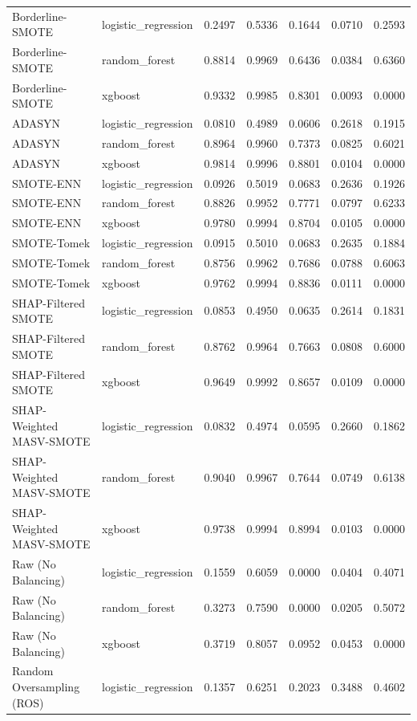 \begin{table}[htbp]
\begin{tabular}{lllllll}
Borderline-SMOTE & logistic_regression & 0.2497 & 0.5336 & 0.1644 & 0.0710 & 0.2593 \\
Borderline-SMOTE & random_forest & 0.8814 & 0.9969 & 0.6436 & 0.0384 & 0.6360 \\
Borderline-SMOTE & xgboost & 0.9332 & 0.9985 & 0.8301 & 0.0093 & 0.0000 \\
ADASYN & logistic_regression & 0.0810 & 0.4989 & 0.0606 & 0.2618 & 0.1915 \\
ADASYN & random_forest & 0.8964 & 0.9960 & 0.7373 & 0.0825 & 0.6021 \\
ADASYN & xgboost & 0.9814 & 0.9996 & 0.8801 & 0.0104 & 0.0000 \\
SMOTE-ENN & logistic_regression & 0.0926 & 0.5019 & 0.0683 & 0.2636 & 0.1926 \\
SMOTE-ENN & random_forest & 0.8826 & 0.9952 & 0.7771 & 0.0797 & 0.6233 \\
SMOTE-ENN & xgboost & 0.9780 & 0.9994 & 0.8704 & 0.0105 & 0.0000 \\
SMOTE-Tomek & logistic_regression & 0.0915 & 0.5010 & 0.0683 & 0.2635 & 0.1884 \\
SMOTE-Tomek & random_forest & 0.8756 & 0.9962 & 0.7686 & 0.0788 & 0.6063 \\
SMOTE-Tomek & xgboost & 0.9762 & 0.9994 & 0.8836 & 0.0111 & 0.0000 \\
SHAP-Filtered SMOTE & logistic_regression & 0.0853 & 0.4950 & 0.0635 & 0.2614 & 0.1831 \\
SHAP-Filtered SMOTE & random_forest & 0.8762 & 0.9964 & 0.7663 & 0.0808 & 0.6000 \\
SHAP-Filtered SMOTE & xgboost & 0.9649 & 0.9992 & 0.8657 & 0.0109 & 0.0000 \\
SHAP-Weighted MASV-SMOTE & logistic_regression & 0.0832 & 0.4974 & 0.0595 & 0.2660 & 0.1862 \\
SHAP-Weighted MASV-SMOTE & random_forest & 0.9040 & 0.9967 & 0.7644 & 0.0749 & 0.6138 \\
SHAP-Weighted MASV-SMOTE & xgboost & 0.9738 & 0.9994 & 0.8994 & 0.0103 & 0.0000 \\
Raw (No Balancing) & logistic_regression & 0.1559 & 0.6059 & 0.0000 & 0.0404 & 0.4071 \\
Raw (No Balancing) & random_forest & 0.3273 & 0.7590 & 0.0000 & 0.0205 & 0.5072 \\
Raw (No Balancing) & xgboost & 0.3719 & 0.8057 & 0.0952 & 0.0453 & 0.0000 \\
Random Oversampling (ROS) & logistic_regression & 0.1357 & 0.6251 & 0.2023 & 0.3488 & 0.4602 \\

\end{tabular}
\end{table}

